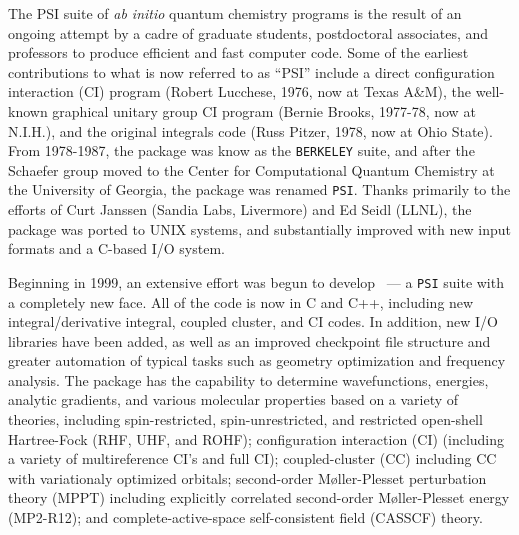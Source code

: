 %
%
%

The PSI suite of {\em ab initio} quantum chemistry programs is the result
of an ongoing attempt by a cadre of graduate students, postdoctoral
associates, and professors to produce efficient and fast computer code.
Some of the earliest contributions to what is now referred to as ``PSI''
include a direct configuration interaction (CI) program (Robert Lucchese,
1976, now at Texas A\&M), the well-known graphical unitary group CI program
(Bernie Brooks, 1977-78, now at N.I.H.), and the original integrals code
(Russ Pitzer, 1978, now at Ohio State).  From 1978-1987, the package was
know as the {\tt BERKELEY} suite, and after the Schaefer group moved to the
Center for Computational Quantum Chemistry at the University of Georgia,
the package was renamed {\tt PSI}.  Thanks primarily to the efforts of Curt
Janssen (Sandia Labs, Livermore) and Ed Seidl (LLNL), the package was
ported to UNIX systems, and substantially improved with new input formats
and a C-based I/O system.

Beginning in 1999, an extensive effort was begun to develop \PSIthree\ ---
a {\tt PSI} suite with a completely new face.  All of the code is now in
C and C++, including new integral/derivative integral, coupled cluster,
and CI codes.  In addition, new I/O libraries have been added, as well as
an improved checkpoint file structure and greater automation of typical
tasks such as geometry optimization and frequency analysis.  The package
has the capability to determine wavefunctions, energies, analytic gradients,
and various molecular properties based on a variety of theories, including
spin-restricted, spin-unrestricted, and restricted open-shell Hartree-Fock
(RHF, UHF, and ROHF); configuration interaction (CI) (including a variety
of multireference CI's and full CI); coupled-cluster (CC) including CC with
variationaly optimized orbitals; second-order M{\o}ller-Plesset perturbation
theory (MPPT) including explicitly correlated second-order M{\o}ller-Plesset
energy (MP2-R12); and complete-active-space self-consistent field (CASSCF)
theory.
